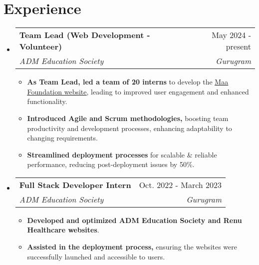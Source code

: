 \documentclass[a4paper,11pt]{article}
\makeatletter
\newcommand{\resumeItem}[1]{
  \item\small{
    {#1 \vspace{-2pt}}
  }
}
\newcommand{\resumeSubheading}[4]{
  \vspace{-2pt}\item
    \begin{tabular*}{0.97\textwidth}[t]{l@{\extracolsep{\fill}}r}
      \textbf{#1} & #2 \\
      \textit{\small#3} & \textit{\small #4} \\
    \end{tabular*}\vspace{-7pt}
}
\newcommand{\resumeItemListStart}{\begin{itemize}}
\newcommand{\resumeItemListEnd}{\end{itemize}\vspace{-5pt}}
\makeatother
\begin{document}
\section*{Experience}
    \begin{itemize}[leftmargin=0.15in, label={}]
    \vspace{3pt}
        \resumeSubheading
          {Team Lead (Web Development - Volunteer)}{May 2024 - present}{ADM Education Society}{Gurugram}
          \resumeItemListStart
            \resumeItem{\textbf{As Team Lead, led a team of 20 interns} to develop the {\href{https://maa-foundation.vercel.app/} {\underline{Maa Foundation website}}}, leading to improved user engagement and enhanced functionality.}
            \resumeItem{\textbf{Introduced Agile and Scrum methodologies,} boosting team productivity and development processes, enhancing adaptability to changing requirements.}
            \resumeItem{\textbf{Streamlined deployment processes} for scalable \& reliable performance, reducing post-deployment issues by 50\%.}
          \resumeItemListEnd

    \vspace{3pt}
          \resumeSubheading
          {Full Stack Developer Intern}{Oct. 2022 - March 2023}{ADM Education Society}{Gurugram}
          \resumeItemListStart
            \resumeItem{\textbf{Developed and optimized ADM Education Society and Renu Healthcare websites}.}
            \resumeItem{\textbf{Assisted in the deployment process,} ensuring the websites were successfully launched and accessible to users.}
          \resumeItemListEnd
    \end{itemize}
\end{document}
